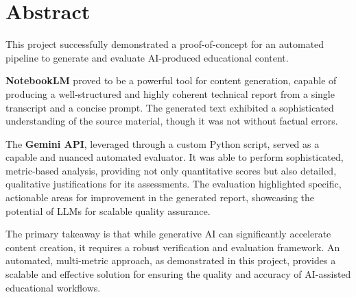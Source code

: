 \section*{Abstract}

This project successfully demonstrated a proof-of-concept for an automated pipeline to generate and evaluate AI-produced educational content.

\textbf{NotebookLM} proved to be a powerful tool for content generation, capable of producing a well-structured and highly coherent technical report from a single transcript and a concise prompt. The generated text exhibited a sophisticated understanding of the source material, though it was not without factual errors.

The \textbf{Gemini API}, leveraged through a custom Python script, served as a capable and nuanced automated evaluator. It was able to perform sophisticated, metric-based analysis, providing not only quantitative scores but also detailed, qualitative justifications for its assessments. The evaluation highlighted specific, actionable areas for improvement in the generated report, showcasing the potential of LLMs for scalable quality assurance.

The primary takeaway is that while generative AI can significantly accelerate content creation, it requires a robust verification and evaluation framework. An automated, multi-metric approach, as demonstrated in this project, provides a scalable and effective solution for ensuring the quality and accuracy of AI-assisted educational workflows.

\newpage